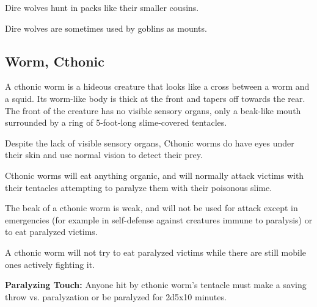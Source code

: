 \begin{multicols*}{2}
Dire wolves hunt in packs like their smaller cousins.

Dire wolves are sometimes used by goblins as mounts.

\subsection{Worm, Cthonic}

A cthonic worm is a hideous creature that looks like a cross between a worm and a squid. Its worm-like body is thick at the front and tapers off towards the rear. The front of the creature has no visible sensory organs, only a beak-like mouth surrounded by a ring of 5-foot-long slime-covered tentacles.

Despite the lack of visible sensory organs, Cthonic worms do have eyes under their skin and use normal vision to detect their prey.

Cthonic worms will eat anything organic, and will normally attack victims with their tentacles attempting to paralyze them with their poisonous slime.

The beak of a cthonic worm is weak, and will not be used for attack except in emergencies (for example in self-defense against creatures immune to paralysis) or to eat paralyzed victims.

A cthonic worm will not try to eat paralyzed victims while there are still mobile ones actively fighting it.

\textbf{Paralyzing Touch:} Anyone hit by cthonic worm's tentacle must make a saving throw vs. paralyzation or be paralyzed for 2d5x10 minutes.


\end{multicols*}
